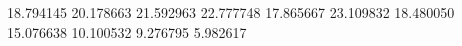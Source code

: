 18.794145
20.178663
21.592963
22.777748
17.865667
23.109832
18.480050
15.076638
10.100532
9.276795
5.982617
